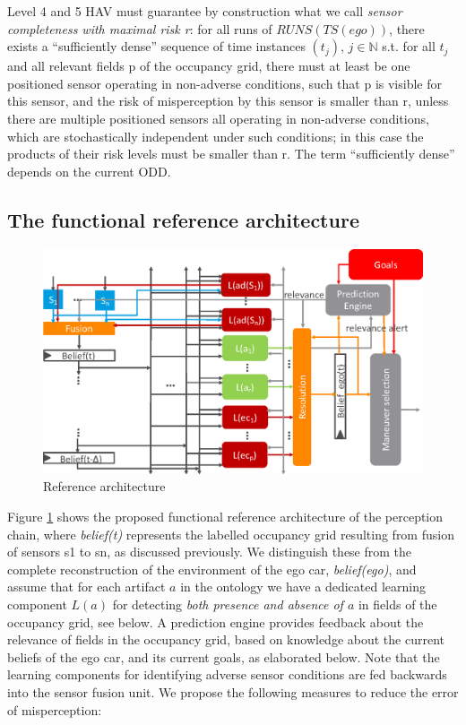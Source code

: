 Level 4 and 5 HAV must guarantee by construction what we call \emph{sensor completeness with maximal risk r}: for all runs of $RUNS(TS(ego))$, there exists a \enquote{sufficiently dense} sequence of time instances $(t_j)$, $j\in \mathbb{N}$ s.t. for all $t_j$ and all relevant fields p of the occupancy grid, there must at least be one positioned sensor operating in non-adverse conditions, such that p is visible for this sensor, and the risk of misperception by this sensor is smaller than r, unless there are multiple positioned sensors all operating in non-adverse conditions, which are stochastically independent under such conditions; in this case the products of their risk levels must be smaller than r. The term \enquote{sufficiently dense} depends on the current ODD.

\subsection{The functional reference architecture}
\begin{figure}
    \centering
    \includegraphics[width=\textwidth]{fig2.eps}
    \caption{Reference architecture}
    \label{fig:architecture}
\end{figure}
Figure \ref{fig:architecture} shows the proposed functional reference architecture of the perception chain, where \textit{belief(t)} represents the labelled occupancy grid resulting from fusion of sensors s1 to sn, as discussed previously. We distinguish these from the complete reconstruction of the environment of the ego car, \textit{belief(ego)}, and assume that for each artifact  $a$ in the ontology we have a dedicated learning component  $L(a)$ for detecting \emph{both presence and absence of $a$} in fields of the occupancy grid, see below. A prediction engine provides feedback about the relevance of fields in the occupancy grid, based on knowledge about the current beliefs of the ego car, and its current goals, as elaborated below. Note that the learning components for identifying adverse sensor conditions are fed backwards into the sensor fusion unit. We propose the following measures to reduce the error of misperception:
